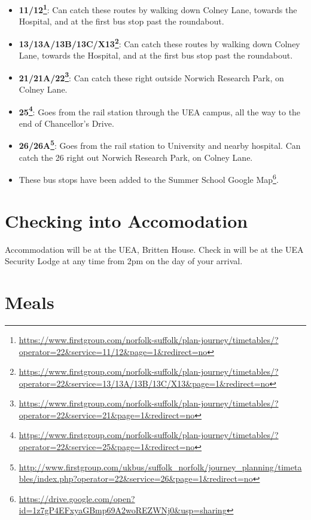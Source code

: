 \documentclass[12pt,]{book}
\providecommand{\tightlist}{%
  \setlength{\itemsep}{0pt}\setlength{\parskip}{0pt}}
\let\rmarkdownfootnote\footnote%
\def\footnote{\protect\rmarkdownfootnote}
\renewcommand{\href}[2]{#2\footnote{\url{#1}}}
\begin{document}
\begin{itemize}
\tightlist
\item
  \textbf{\href{https://www.firstgroup.com/norfolk-suffolk/plan-journey/timetables/?operator=22\&service=11/12\&page=1\&redirect=no}{11/12}}:
  Can catch these routes by walking down Colney Lane, towards the
  Hospital, and at the first bus stop past the roundabout.
\item
  \textbf{\href{https://www.firstgroup.com/norfolk-suffolk/plan-journey/timetables/?operator=22\&service=13/13A/13B/13C/X13\&page=1\&redirect=no}{13/13A/13B/13C/X13}}:
  Can catch these routes by walking down Colney Lane, towards the
  Hospital, and at the first bus stop past the roundabout.
\item
  \textbf{\href{https://www.firstgroup.com/norfolk-suffolk/plan-journey/timetables/?operator=22\&service=21\&page=1\&redirect=no}{21/21A/22}}:
  Can catch these right outside Norwich Research Park, on Colney Lane.
\item
  \textbf{\href{https://www.firstgroup.com/norfolk-suffolk/plan-journey/timetables/?operator=22\&service=25\&page=1\&redirect=no}{25}}:
  Goes from the rail station through the UEA campus, all the way to the
  end of Chancellor's Drive.
\item
  \textbf{\href{http://www.firstgroup.com/ukbus/suffolk_norfolk/journey_planning/timetables/index.php?operator=22\&service=26\&page=1\&redirect=no}{26/26A}}:
  Goes from the rail station to University and nearby hospital. Can
  catch the 26 right out Norwich Research Park, on Colney Lane.
\item
  These bus stops have been added to the
  \href{https://drive.google.com/open?id=1z7gP4EFxyaGBmp69A2woREZWNj0\&usp=sharing}{Summer
  School Google Map}.
\end{itemize}

\section*{Checking into Accomodation}\label{checking-into-accomodation}

Accommodation will be at the UEA, Britten House. Check in will be at the
UEA Security Lodge at any time from 2pm on the day of your arrival.

\section*{Meals}\label{meals}
\end{document}
